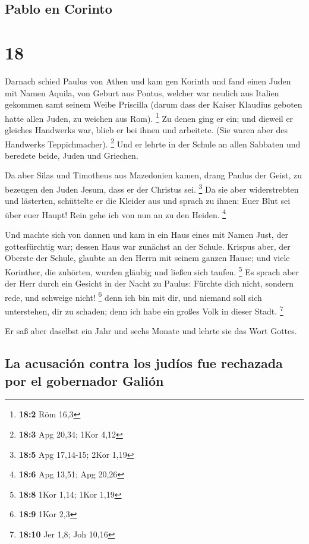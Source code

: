 \hypertarget{pablo-en-corinto}{%
\subsection{Pablo en Corinto}\label{pablo-en-corinto}}

\hypertarget{section-17}{%
\section{18}\label{section-17}}

 Darnach schied Paulus von Athen und kam gen Korinth
 und fand einen Juden mit Namen Aquila, von Geburt aus
Pontus, welcher war neulich aus Italien gekommen samt seinem Weibe
Priscilla (darum dass der Kaiser Klaudius geboten hatte allen Juden, zu
weichen aus Rom). \footnote{\textbf{18:2} Röm 16,3}  Zu
denen ging er ein; und dieweil er gleiches Handwerks war, blieb er bei
ihnen und arbeitete. (Sie waren aber des Handwerks Teppichmacher).
\footnote{\textbf{18:3} Apg 20,34; 1Kor 4,12}  Und er
lehrte in der Schule an allen Sabbaten und beredete beide, Juden und
Griechen.

 Da aber Silas und Timotheus aus Mazedonien kamen, drang
Paulus der Geist, zu bezeugen den Juden Jesum, dass er der Christus sei.
\footnote{\textbf{18:5} Apg 17,14-15; 2Kor 1,19}  Da sie
aber widerstrebten und lästerten, schüttelte er die Kleider aus und
sprach zu ihnen: Euer Blut sei über euer Haupt! Rein gehe ich von nun an
zu den Heiden. \footnote{\textbf{18:6} Apg 13,51; Apg 20,26}

 Und machte sich von dannen und kam in ein Haus eines mit
Namen Just, der gottesfürchtig war; dessen Haus war zunächst an der
Schule.  Krispus aber, der Oberste der Schule, glaubte an
den Herrn mit seinem ganzen Hause; und viele Korinther, die zuhörten,
wurden gläubig und ließen sich taufen. \footnote{\textbf{18:8} 1Kor
  1,14; 1Kor 1,19}  Es sprach aber der Herr durch ein
Gesicht in der Nacht zu Paulus: Fürchte dich nicht, sondern rede, und
schweige nicht! \footnote{\textbf{18:9} 1Kor 2,3}  denn
ich bin mit dir, und niemand soll sich unterstehen, dir zu schaden; denn
ich habe ein großes Volk in dieser Stadt. \footnote{\textbf{18:10} Jer
  1,8; Joh 10,16}

 Er saß aber daselbst ein Jahr und sechs Monate und
lehrte sie das Wort Gottes.

\hypertarget{la-acusaciuxf3n-contra-los-juduxedos-fue-rechazada-por-el-gobernador-galiuxf3n}{%
\subsection{La acusación contra los judíos fue rechazada por el
gobernador
Galión}\label{la-acusaciuxf3n-contra-los-juduxedos-fue-rechazada-por-el-gobernador-galiuxf3n}}

